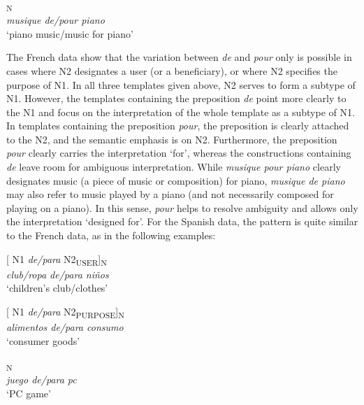 \documentclass[output=paper]{langsci/langscibook}
\begin{document}
\ea{}\textsubscript{N}\\
\textit{musique de/pour piano}\\
`piano music\slash music for piano'
\z

The French data show that the variation between \textit{de} and \textit{pour} only is possible in cases where N2 designates a user (or a beneficiary), or where N2 specifies the purpose of N1. In all three templates given above, N2 serves to form a subtype of N1. However, the templates containing the preposition \textit{de} point more clearly to the N1 and focus on the interpretation of the whole template as a subtype of N1. In templates containing the preposition \textit{pour}, the preposition is clearly attached to the N2, and the semantic emphasis is on N2. Furthermore, the preposition \textit{pour} clearly carries the interpretation `for', whereas the constructions containing \textit{de} leave room for ambiguous interpretation. While \textit{musique pour piano} clearly designates music (a piece of music or composition) for piano, \textit{musique de piano} may also refer to music played by a piano (and not necessarily composed for playing on a piano). In this sense, \textit{pour} helps to resolve ambiguity and allows only the interpretation `designed for'. For the Spanish data, the pattern is quite similar to the French data, as in the following examples: 

\begin{exe}\ex\begin{minipage}[t]{0.4\textwidth}    %
[ N1 \textit{de/para} N2\textsubscript{USER}]\textsubscript{N}\\
\textit{club/ropa de/para niños }\\
`children’s club/clothes'
\end{minipage}\hfill%
\begin{minipage}[t]{0.45\textwidth}
[ N1 \textit{de/para} N2\textsubscript{PURPOSE}]\textsubscript{N}\\
\textit{alimentos de/para consumo}\\
`consumer goods'
\end{minipage}\end{exe}

\ea{}\textsubscript{N}\\
\textit{juego de/para pc}\\
`PC game'
\z
\end{document}
